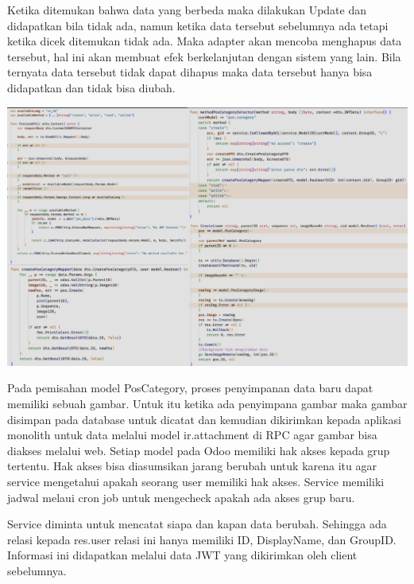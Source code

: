 Ketika ditemukan bahwa data yang berbeda maka dilakukan Update dan didapatkan bila tidak ada, namun ketika data tersebut sebelumnya ada tetapi ketika dicek ditemukan tidak ada. Maka adapter akan mencoba menghapus data tersebut, hal ini akan membuat efek berkelanjutan dengan sistem yang lain. Bila ternyata data tersebut tidak dapat dihapus maka data tersebut hanya bisa didapatkan dan tidak bisa diubah.

\begin{center}
	\includegraphics[width=14cm]{img/bab_4/strangle_3.png}
	\label{fig:strangle_3}
\end{center}

Pada pemisahan  model PosCategory, proses penyimpanan data baru dapat memiliki sebuah gambar. Untuk itu ketika ada penyimpana gambar maka gambar disimpan pada database untuk dicatat dan kemudian dikirimkan kepada aplikasi monolith untuk data melalui model ir.attachment di RPC agar gambar bisa diakses melalui web. Setiap model pada Odoo memiliki hak akses kepada grup tertentu. Hak akses bisa diasumsikan jarang berubah untuk karena itu agar service mengetahui apakah seorang user memiliki hak akses. Service memiliki jadwal melaui cron job untuk mengecheck apakah ada akses grup baru.

Service diminta untuk mencatat siapa dan kapan data berubah. Sehingga ada relasi kepada res.user relasi ini hanya memiliki ID, DisplayName, dan GroupID. Informasi ini didapatkan melalui data JWT yang dikirimkan oleh client sebelumnya. \\



